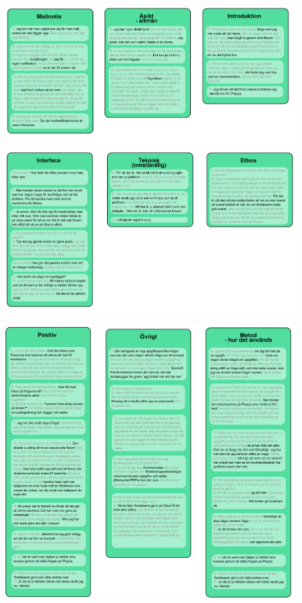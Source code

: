 \begin{figure}[hbtp]
    \centering
    \includegraphics[scale=0.75,angle=90]{appendix/appendix_green/part4b.png}
    \caption*{}
    \label{fig:nr8_part6}
\end{figure}

\begin{figure}[hbtp]
    \centering
    \includegraphics[scale=0.8,angle=90]{appendix/appendix_green/part5b.png}
    \caption*{}
    \label{fig:nr8_part7}
\end{figure}

